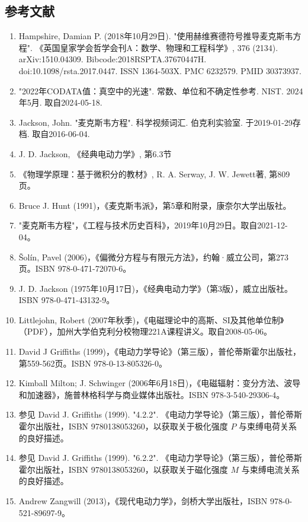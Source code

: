 \subsection{参考文献}
\begin{enumerate}
\item Hampshire, Damian P. (2018年10月29日). "使用赫维赛德符号推导麦克斯韦方程". 《英国皇家学会哲学会刊A：数学、物理和工程科学》, 376 (2134). arXiv:1510.04309. Bibcode:2018RSPTA.37670447H. doi:10.1098/rsta.2017.0447. ISSN 1364-503X. PMC 6232579. PMID 30373937.
\item "2022年CODATA值：真空中的光速". 常数、单位和不确定性参考. NIST. 2024年5月. 取自2024-05-18.
\item Jackson, John. "麦克斯韦方程". 科学视频词汇. 伯克利实验室. 于2019-01-29存档. 取自2016-06-04.
\item J. D. Jackson, 《经典电动力学》, 第6.3节
\item 《物理学原理：基于微积分的教材》, R. A. Serway, J. W. Jewett著, 第809页。
\item Bruce J. Hunt (1991)，《麦克斯韦派》，第5章和附录，康奈尔大学出版社。
\item "麦克斯韦方程"，《工程与技术历史百科》，2019年10月29日。取自2021-12-04。
\item Šolín, Pavel (2006)，《偏微分方程与有限元方法》，约翰·威立公司，第273页。ISBN 978-0-471-72070-6。
\item J. D. Jackson (1975年10月17日)，《经典电动力学》（第3版），威立出版社。ISBN 978-0-471-43132-9。
\item Littlejohn, Robert (2007年秋季)，《电磁理论中的高斯、SI及其他单位制》（PDF），加州大学伯克利分校物理221A课程讲义。取自2008-05-06。
\item David J Griffiths (1999)，《电动力学导论》（第三版），普伦蒂斯霍尔出版社，第559-562页。ISBN 978-0-13-805326-0。
\item Kimball Milton; J. Schwinger (2006年6月18日)，《电磁辐射：变分方法、波导和加速器》，施普林格科学与商业媒体出版社。ISBN 978-3-540-29306-4。
\item 参见 David J. Griffiths (1999). "4.2.2". 《电动力学导论》（第三版），普伦蒂斯霍尔出版社，ISBN 9780138053260，以获取关于极化强度 \(P\) 与束缚电荷关系的良好描述。
\item 参见 David J. Griffiths (1999). "6.2.2". 《电动力学导论》（第三版），普伦蒂斯霍尔出版社，ISBN 9780138053260，以获取关于磁化强度 \(M\) 与束缚电流关系的良好描述。
\item Andrew Zangwill (2013)，《现代电动力学》，剑桥大学出版社，ISBN 978-0-521-89697-9。

\end{enumerate}
